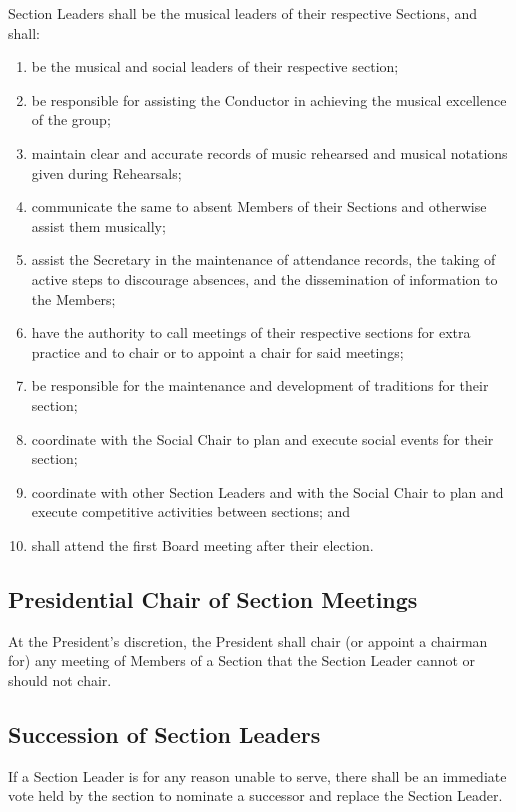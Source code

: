 \documentclass{article}
\begin{document}
Section Leaders shall be the musical leaders of their respective Sections,
and shall:
\begin{enumerate}
\item be the musical and social leaders of their respective section;
\item be responsible for assisting the Conductor in achieving the musical
excellence of the group;
\item maintain clear and accurate records of music rehearsed and musical
notations given during Rehearsals;
\item communicate the same to absent Members of their Sections and otherwise
assist them musically;
\item assist the Secretary in the maintenance of attendance records, the
taking of active steps to discourage absences, and the dissemination
of information to the Members;
\item have the authority to call meetings of their respective sections for
extra practice and to chair or to appoint a chair for said meetings;
\item be responsible for the maintenance and development of traditions for
their section;
\item coordinate with the Social Chair to plan and execute social events
for their section;
\item coordinate with other Section Leaders and with the Social Chair to
plan and execute competitive activities between sections; and
\item shall attend the first Board meeting after their election.
\end{enumerate}

\subsection{Presidential Chair of Section Meetings}

At the President's discretion, the President shall chair (or appoint a chairman
for) any meeting of Members of a Section that the Section Leader cannot
or should not chair.

\subsection{Succession of Section Leaders}

If a Section Leader is for any reason unable to serve, there shall
be an immediate vote held by the section to nominate a successor and
replace the Section Leader.
\end{document}
